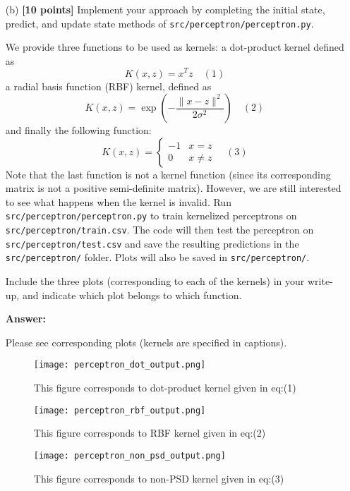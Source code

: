 \documentclass{article}
\begin{document}
\begin{enumerate}
\begin{enumerate}
  \end{enumerate}

  \item[(b)] \textbf{[10 points]} Implement your approach by completing the initial state, predict, and update state methods of \texttt{src/perceptron/perceptron.py}.

  We provide three functions to be used as kernels: a dot-product kernel defined as
  \[
  K(x, z) = x^T z \quad (1)
  \]
  a radial basis function (RBF) kernel, defined as
  \[
  K(x, z) = \exp\left(-\frac{\|x - z\|^2}{2\sigma^2}\right) \quad (2)
  \]
  and finally the following function:
  \[
  K(x, z) = \begin{cases} -1 & x = z \\ 0 & x \neq z \end{cases} \quad (3)
  \]
  Note that the last function is not a kernel function (since its corresponding matrix is not a positive semi-definite matrix). However, we are still interested to see what happens when the kernel is invalid. Run \texttt{src/perceptron/perceptron.py} to train kernelized perceptrons on \texttt{src/perceptron/train.csv}. The code will then test the perceptron on \texttt{src/perceptron/test.csv} and save the resulting predictions in the \texttt{src/perceptron/} folder. Plots will also be saved in \texttt{src/perceptron/}.

  Include the three plots (corresponding to each of the kernels) in your write-up, and indicate which plot belongs to which function.

\textbf{Answer:}

Please see corresponding plots (kernels are specified in captions).

\begin{figure}[H]
    \centering
    \texttt{[image: perceptron\_dot\_output.png]}
    \caption{This figure corresponds to dot-product kernel given in eq:(1)}
    \label{fig:1}
\end{figure}

\begin{figure}[H]
    \centering
    \texttt{[image: perceptron\_rbf\_output.png]}
    \caption{This figure corresponds to RBF kernel given in eq:(2)}
    \label{fig:2}
\end{figure}

\begin{figure}[H]
    \centering
    \texttt{[image: perceptron\_non\_psd\_output.png]}
    \caption{This figure corresponds to non-PSD kernel given in eq:(3)}
    \label{fig:3}
\end{figure}
    

\end{enumerate}
\end{document}
